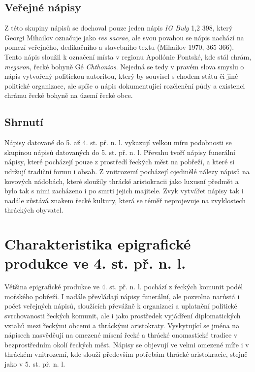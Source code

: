 \subsection[veřejné-nápisy-2]{Veřejné nápisy}

Z této skupiny nápisů se dochoval pouze jeden nápis {\em IG Bulg} 1,2 398, který Georgi Mihailov označuje jako {\em res sacrae}, ale svou povahou se nápis nachází na pomezí veřejného, dedikačního a stavebního textu (Mihailov 1970, 365-366). Tento nápis sloužil k označení místa v regionu Apollónie Pontské, kde stál chrám, {\em megaron}, řecké bohyně Gé {\em Chthonios}. Nejedná se tedy v pravém slova smyslu o nápis vytvořený politickou autoritou, který by souvisel s chodem státu či jiné politické organizace, ale spíše o nápis dokumentující rozčlenění půdy a existenci chrámu řecké bohyně na území řecké obce.

\subsection[shrnutí-6]{Shrnutí}

Nápisy datované do 5. až 4. st. př. n. l. vykazují velkou míru podobnosti se skupinou nápisů datovaných do 5. st. př. n. l. Převahu tvoří nápisy funerální nápisy, které pocházejí pouze z prostředí řeckých měst na pobřeží, a které si udržují tradiční formu i obsah. Z vnitrozemí pocházejí ojedinělé nálezy nápisů na kovových nádobách, které sloužily thrácké aristokracii jako luxusní předmět a bylo tak s nimi zacházeno i po smrti jejich majitele. Zvyk vytvářet nápisy tak i nadále zůstává znakem řecké kultury, která se téměř neprojevuje na zvyklostech thráckých obyvatel.

\section[charakteristika-epigrafické-produkce-ve-4.-st.-př.-n.-l.]{Charakteristika epigrafické produkce ve 4. st. př. n. l.}

Většina epigrafické produkce ve 4. st. př. n. l. pochází z řeckých komunit podél mořského pobřeží. I nadále převládají nápisy funerální, ale pozvolna narůstá i počet veřejných nápisů, sloužících převážně k organizaci a uplatnění politické svrchovanosti řeckých komunit, ale i jako prostředek vyjádření diplomatických vztahů mezi řeckými obcemi a thráckými aristokraty. Vyskytující se jména na nápisech nasvědčují na omezené mísení řecké a thrácké onomastické tradice v bezprostředním okolí řeckých měst. Nápisy se objevují ve velmi omezené míře i v thráckém vnitrozemí, kde slouží především potřebám thrácké aristokracie, stejně jako v 5. st. př. n. l.

